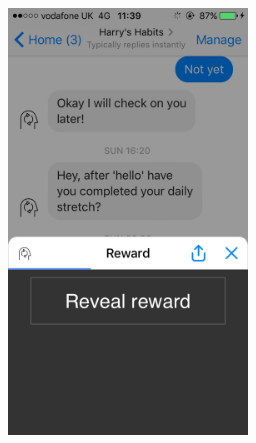 \begin{figure}[H]
  \centering
  \includegraphics[width=2.5in]{resources/design/reward-visual-1.png}
\end{figure}

